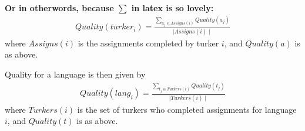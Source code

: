 \documentclass[11pt]{article}
\begin{document}
\textbf{Or in otherwords, because $\sum$ in latex is so lovely:}
\begin{align}	
	Quality(turker_i) = \frac{\sum_{a_j \in Assigns(i)}Quality(a_j)}{\mid Assigns(i) \mid}
\end{align}	
where $Assigns(i)$ is the assignments completed by turker $i$, and $Quality(a)$ is as above.
	
Quality for a language is then given by
\begin{align}	
	Quality(lang_i) = \frac{\sum_{t_j \in Turkers(i)}Quality(t_j)}{\mid Turkers(i) \mid}
\end{align}	
where $Turkers(i)$ is the set of turkers who completed assignments for language $i$, and $Quality(t)$ is as above.




\end{document}
